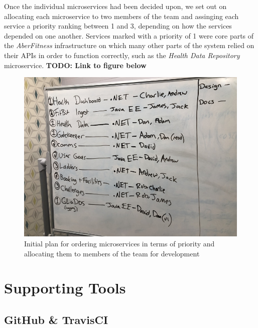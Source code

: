 Once the individual microservices had been decided upon, we set out on allocating each microservice to two members of the team and assinging each service a priority ranking between 1 and 3, depending on how the services depended on one another. Services marked with a priority of 1 were core parts of the \textit{AberFitness} infrastructure on which many other parts of the system relied on their APIs in order to function correctly, such as the \textit{Health Data Repository} microservice.  \textbf{TODO: Link to figure below}

\begin{figure}[H]
    \centering
    \includegraphics[width=\textwidth]{Images/Numbering_Microservices.jpg}
    \caption{Initial plan for ordering microservices in terms of priority and allocating them to members of the team for development}
\end{figure}


\section{Supporting Tools}
\subsection{GitHub \& TravisCI}


